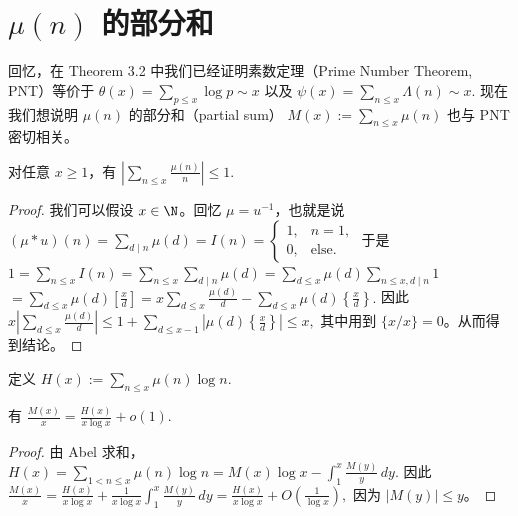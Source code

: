 \section{\texorpdfstring{\(\mu(n)\) 的部分和}{mu(n) 的部分和}}

回忆，在 Theorem 3.2 中我们已经证明素数定理（Prime Number Theorem, PNT）等价于
\(\textstyle \theta(x)=\allowbreak{}\sum_{p\leq\allowbreak{} x}\log p\sim\allowbreak{} x\)
以及
\(\textstyle \psi(x)=\allowbreak{}\sum_{n\leq\allowbreak{} x}\Lambda(n)\sim\allowbreak{} x.\)
现在我们想说明 $\mu(n)$ 的部分和（partial sum）
\(\textstyle M(x):=\allowbreak{}\sum_{n\leq\allowbreak{} x}\mu(n)\)
也与 PNT 密切相关。

\begin{lemma}[原文 Lemma 3.16]
	对任意 $x\geq 1$，有
	\(\textstyle \left|\sum_{n\leq\allowbreak{} x}\frac{\mu(n)}n\right|\leq\allowbreak{} 1.\)
\end{lemma}

\begin{proof}
	我们可以假设 $x\in\N$。回忆 $\mu=u^{-1}$，也就是说
	\(\textstyle (\mu*u)(n)=\sum_{d\mid n}\mu(d)=I(n) = \begin{cases} 1, & n=1,\\ 0, & \text{else}. \end{cases}\)
	于是
	\(\textstyle 1 =\allowbreak{} \sum_{n\leq\allowbreak{} x}I(n) =\allowbreak{} \sum_{n\leq\allowbreak{} x}\sum_{d\mid\allowbreak{} n}\mu(d) =\allowbreak{} \sum_{d\leq\allowbreak{} x}\mu(d)\sum_{n\leq\allowbreak{} x,\allowbreak{} d\mid\allowbreak{} n}1\) \(\textstyle =\allowbreak{} \sum_{d\leq\allowbreak{} x}\mu(d)\left[\frac xd\right] =\allowbreak{} x\sum_{d\leq\allowbreak{} x}\frac{\mu(d)}d - \sum_{d\leq\allowbreak{} x}\mu(d)\left\{\frac xd\right\}.\)
	因此
	\(\textstyle x\left|\sum_{d\leq\allowbreak{} x}\frac{\mu(d)}d\right| \leq\allowbreak{} 1+\allowbreak{}\sum_{d\leq\allowbreak{} x-1}\left|\mu(d)\left\{\frac xd\right\}\right| \leq\allowbreak{} x,\allowbreak{}\)
	其中用到 $\{x/x\}=0$。从而得到结论。
\end{proof}

定义
\(\textstyle H(x):=\allowbreak{}\sum_{n\leq\allowbreak{} x}\mu(n)\log n.\)

\begin{lemma}[原文 Lemma 3.17]
	有
	\(\textstyle \frac{M(x)}x =\allowbreak{} \frac{H(x)}{x\log x}+\allowbreak{}o(1).\)
\end{lemma}

\begin{proof}
	由 Abel 求和，
	\(\textstyle H(x) =\allowbreak{} \sum_{1<n\leq\allowbreak{} x}\mu(n)\log n =\allowbreak{} M(x)\log x-\int_1^x\frac{M(y)}y\,dy.\)
	因此
	\(\textstyle \frac{M(x)}x =\allowbreak{} \frac{H(x)}{x\log x} +\allowbreak{} \frac1{x\log x}\int_1^x\frac{M(y)}y\,dy =\allowbreak{} \frac{H(x)}{x\log x} +\allowbreak{} O\left(\frac1{\log x}\right),\allowbreak{}\)
	因为 $|M(y)|\leq y$。
\end{proof}


